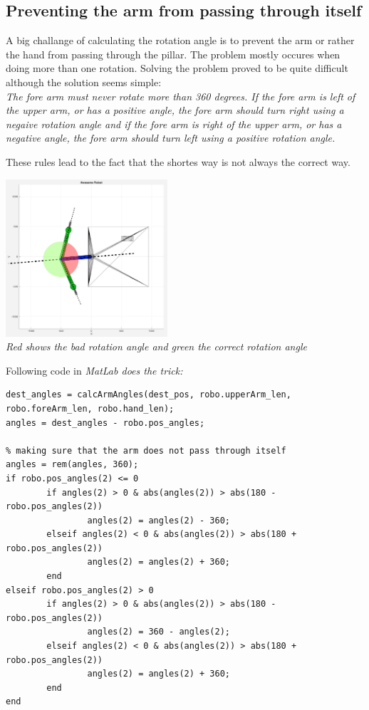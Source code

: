\subsection{Preventing the arm from passing through itself}
A big challange of calculating the rotation angle is to prevent the arm or rather the hand from passing through the pillar. The problem mostly occures when doing more than one rotation. Solving the problem proved to be quite difficult although the solution seems simple:\\

{\em The fore arm must never rotate more than 360 degrees. If the fore arm is left of the upper arm, or has a positive angle, the fore arm should turn right using a negaive rotation angle and if the fore arm is right of the upper arm, or has a negative angle, the fore arm should turn left using a positive rotation angle.}

These rules lead to the fact that the shortes way is not always the correct way.

\begin{center}
\includegraphics[width=0.45\textwidth]{imgs/AngleCalc/robot_passThroughProblem.jpg}\\
\textit{Red shows the bad rotation angle and green the correct rotation angle}
\end{center}

Following code in \em{MatLab} does the trick:

\begin{framed}\begin{verbatim}
dest_angles = calcArmAngles(dest_pos, robo.upperArm_len, robo.foreArm_len, robo.hand_len);
angles = dest_angles - robo.pos_angles;
    
% making sure that the arm does not pass through itself
angles = rem(angles, 360);
if robo.pos_angles(2) <= 0
        if angles(2) > 0 & abs(angles(2)) > abs(180 - robo.pos_angles(2))
                angles(2) = angles(2) - 360;
        elseif angles(2) < 0 & abs(angles(2)) > abs(180 + robo.pos_angles(2))
                angles(2) = angles(2) + 360;
        end
elseif robo.pos_angles(2) > 0
        if angles(2) > 0 & abs(angles(2)) > abs(180 - robo.pos_angles(2))
                angles(2) = 360 - angles(2);
        elseif angles(2) < 0 & abs(angles(2)) > abs(180 + robo.pos_angles(2))
                angles(2) = angles(2) + 360;
        end
end
\end{verbatim}\end{framed}

